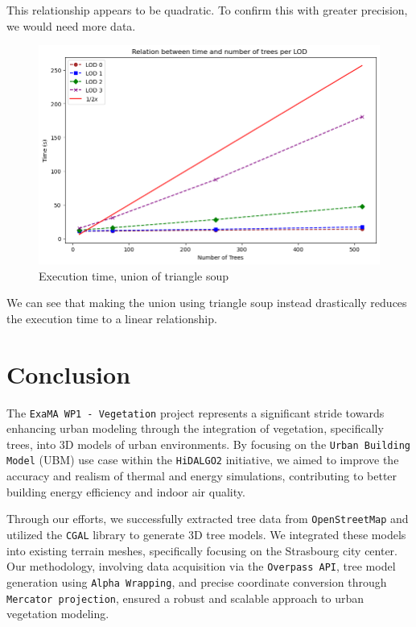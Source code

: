 \documentclass[12pt]{article}
\begin{document}
This relationship appears to be quadratic. To confirm this with
greater precision, we would need more data.

\begin{figure}[H]
    \centering
    \includegraphics[width=1\textwidth]{images/bench_time_ntree_linear.png}
    \caption{Execution time, union of triangle soup}
\end{figure}

We can see that making the union using triangle soup instead drastically reduces the
execution time to a linear relationship.

\newpage

\section{Conclusion}

The \texttt{ExaMA WP1 - Vegetation} project represents a significant stride towards 
enhancing urban modeling through the integration of vegetation, specifically 
trees, into 3D models of urban environments. By focusing on the \texttt{Urban Building 
Model} (UBM) use case within the \texttt{HiDALGO2} initiative, we aimed to improve the 
accuracy and realism of thermal and energy simulations, contributing to better 
building energy efficiency and indoor air quality.

Through our efforts, we successfully extracted tree data from
\texttt{OpenStreetMap} and utilized the \texttt{CGAL} library to generate 3D
tree models. We integrated these models into existing terrain meshes,
specifically focusing on the Strasbourg city center. Our methodology, involving
data acquisition via the \texttt{Overpass API}, tree model generation using
\texttt{Alpha Wrapping}, and precise coordinate conversion through 
\texttt{Mercator projection}, ensured a robust and scalable approach to urban
vegetation modeling.
\end{document}
